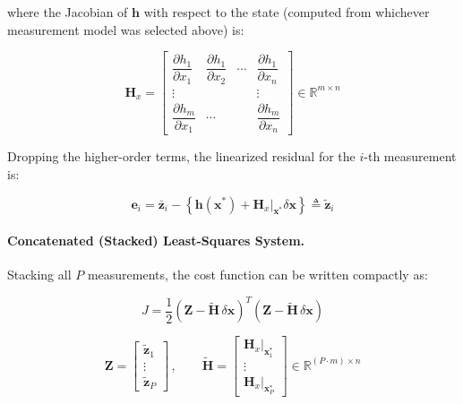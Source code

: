 \documentclass{article}
\newcommand{\vect}[1]{\mathbf{#1}}
\newcommand{\mat}[1]{\mathbf{#1}}
\newcommand{\stateVec}{\vect{x}}
\newcommand{\dstate}{\delta\vect{x}}
\newcommand{\measBar}{\bar{\vect{z}}}
\newcommand{\measTilde}{\tilde{\vect{z}}}
\newcommand{\err}{\vect{e}}
\newcommand{\Jac}{\mat{H}_x} %
\newcommand{\stackJac}{\tilde{\mat{H}}} %
\newcommand{\stackMeas}{\vect{Z}} %
\begin{document}
where the Jacobian of $\vect{h}$ with respect to the state (computed from whichever measurement model was selected above) is:

\begin{equation}
    \Jac =
    \begin{bmatrix}
        \dfrac{\partial h_1}{\partial x_1} & \dfrac{\partial h_1}{\partial x_2} & \cdots & \dfrac{\partial h_1}{\partial x_n} \\[2mm]
        \vdots & & & \vdots \\[1mm]
        \dfrac{\partial h_m}{\partial x_1} & \cdots & & \dfrac{\partial h_m}{\partial x_n}
    \end{bmatrix} \in \mathbb{R}^{m \times n}
\end{equation}

Dropping the higher-order terms, the linearized residual for the $i$-th measurement is:

\begin{equation}
    \err_i = \measBar_i - \left\{ \vect{h}(\stateVec^*) + \Jac\Big|_{\stateVec^*} \dstate \right\} \triangleq \measTilde_i
\end{equation}

\paragraph{Concatenated (Stacked) Least-Squares System.} Stacking all $P$ measurements, the cost function can be written compactly as:

\begin{equation}
    J = \frac{1}{2} \left( \stackMeas - \stackJac \, \dstate \right)^T \left( \stackMeas - \stackJac \, \dstate \right)
\end{equation}

\begin{equation}
    \stackMeas =
    \begin{bmatrix}
        \measTilde_1 \\
        \vdots \\
        \measTilde_P
    \end{bmatrix}
    \, , \qquad
    \stackJac =
    \begin{bmatrix}
        \Jac\big|_{\stateVec^*_1} \\
        \vdots \\
        \Jac\big|_{\stateVec^*_P}
    \end{bmatrix}
    \in \mathbb{R}^{(P \cdot m) \times n}
\end{equation}
\end{document}
